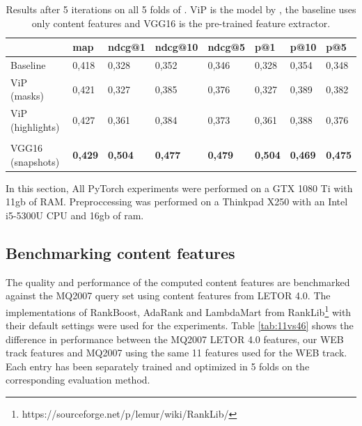 \begin{table}[t]
\begin{tabular}{l | lllllll }
\toprule
         & map   & ndcg@1 & ndcg@10 & ndcg@5 & p@1   & p@10  & p@5   \\ \midrule
Baseline  & 0,418 & 0,328  & 0,352   & 0,346  & 0,328 & 0,354 & 0,348 \\
ViP (masks)       & 0,421 & 0,327  & 0,385   & 0,376  & 0,327 & 0,389 & 0,382 \\
ViP (highlights)  & 0,427 & 0,361  & 0,384   & 0,373  & 0,361 & 0,388 & 0,376 \\
                 &       &        &         &        &       &       &       \\\bottomrule
VGG16 (snapshots) & \textbf{0,429} & \textbf{0,504}  & \textbf{0,477}   & \textbf{0,479}  & \textbf{0,504} & \textbf{0,469} & \textbf{0,475} \\ \bottomrule
\end{tabular}
\centering
\caption{Results after 5 iterations on all 5 folds of \datasetname. ViP is the model by \citet{fan2017learning}, the baseline uses only content features and VGG16 is the pre-trained feature extractor.}
\label{tab:results}
\end{table}


In this section, 
All PyTorch experiments were performed on a GTX 1080 Ti with 11gb of RAM. Preproccessing was performed on a Thinkpad X250 with an Intel i5-5300U CPU and 16gb of ram. 


\subsection{Benchmarking content features}
The quality and performance of the computed content features are benchmarked against the MQ2007 query set using content features from LETOR 4.0. The implementations of RankBoost, AdaRank and LambdaMart from RankLib\footnote{https://sourceforge.net/p/lemur/wiki/RankLib/} with their default settings were used for the experiments. Table \ref{tab:11vs46} shows the difference in performance between the MQ2007 LETOR 4.0 features, our WEB track features and MQ2007 using the same 11 features used for the WEB track. Each entry has been separately trained and optimized in 5 folds on the corresponding evaluation method. 

